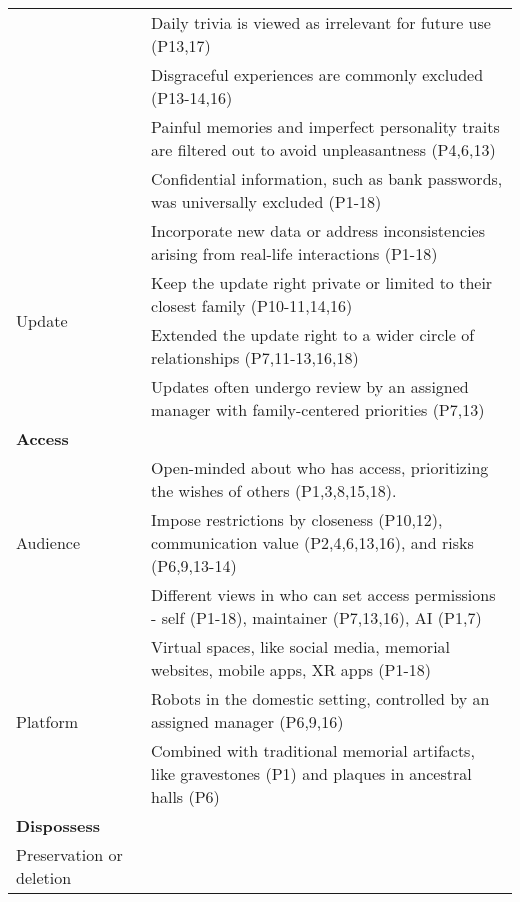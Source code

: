\begin{table*}[htbp]
\begin{tabular}{p{}p{}}
            & \cellcolor{gray!15}Daily trivia is viewed as irrelevant for future use (P13,17) \\ %
            & Disgraceful experiences are commonly excluded (P13-14,16) \\ %
            & \cellcolor{gray!15}Painful memories and imperfect personality traits are filtered out to avoid unpleasantness (P4,6,13) \\ %
            & Confidential information, such as bank passwords, was universally excluded (P1-18) \\ %
    \hline
    \multirow{4}{=}{Update}
            & \cellcolor{gray!15}Incorporate new data or address inconsistencies arising from real-life interactions (P1-18) \\ %
            & Keep the update right private or limited to their closest family (P10-11,14,16) \\ %
            & \cellcolor{gray!15}Extended the update right to a wider circle of relationships (P7,11-13,16,18) \\ %
            & Updates often undergo review by an assigned manager with family-centered priorities (P7,13) \\
    \hline
    \textbf{Access}&\\
    \hline
     \multirow{3}{=}{Audience} 
            & \cellcolor{gray!15}Open-minded about who has access, prioritizing the wishes of others (P1,3,8,15,18). \\ %
             & Impose restrictions by closeness (P10,12), communication value (P2,4,6,13,16), and risks (P6,9,13-14) \\ %
             & \cellcolor{gray!15}Different views in who can set access permissions - self (P1-18), maintainer (P7,13,16), AI (P1,7) \\
    \hline
    \multirow{3}{=}{Platform} 
            & Virtual spaces, like social media, memorial websites, mobile apps, XR apps (P1-18) \\ %
             & \cellcolor{gray!15}Robots in the domestic setting, controlled by an assigned manager (P6,9,16) \\ %
             & Combined with traditional memorial artifacts, like gravestones (P1) and plaques in ancestral halls (P6) \\
    \hline
    \textbf{Dispossess}&\\
    \hline
    \multirow{3}{=}{Preservation or deletion} 

\end{tabular}
\end{table*}
